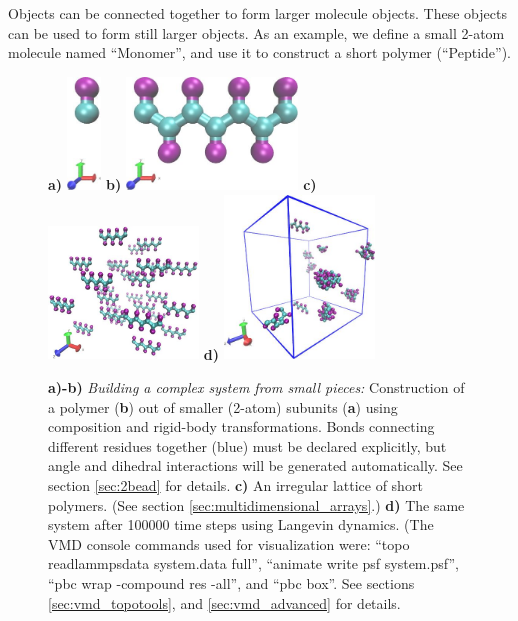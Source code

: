 \documentclass[11pt]{article}
\begin{document}
Objects can be connected together to form larger molecule objects.
These objects can be used to form still larger objects.
As an example, we define a small 2-atom molecule named ``Monomer'',
and use it to construct a short polymer (``Peptide'').

\begin{figure}[htbp]
\centering
\textbf{a)}
\includegraphics[height=3cm]{2bead_residue.jpg}
\quad \quad \quad \quad \quad
\textbf{b)}
\includegraphics[height=3cm]{2bead_peptide.jpg}
\newline
\vspace{10 mm}
\newline
\textbf{c)}
\includegraphics[width=4cm]{2bead_peptides_nopbc_t=0_LR.jpg}
\textbf{d)}
\includegraphics[width=4cm]{2bead_peptides_t=100ps_LR.jpg}
\caption{
\label{fig:2bead_peptide}
\textbf{a)-b)}
\textit{Building a complex system from small pieces:}
Construction of a polymer (\textbf{b}) 
out of smaller (2-atom) subunits (\textbf{a})
using composition and rigid-body transformations. 
Bonds connecting different residues together (blue) 
must be declared explicitly, 
but angle and dihedral interactions will be generated automatically.
See section \ref{sec:2bead} for details.
\textbf{c)}
An irregular lattice of short polymers.
(See section \ref{sec:multidimensional_arrays}.)
\textbf{d)}
The same system after 100000 time steps using Langevin dynamics.
(The VMD console commands used for visualization were:
``topo readlammpsdata system.data full'',
``animate write psf system.psf'',
``pbc wrap -compound res -all'', and 
``pbc box''.
See sections \ref{sec:vmd_topotools}, and \ref{sec:vmd_advanced}
for details.}
\end{figure}
\end{document}
